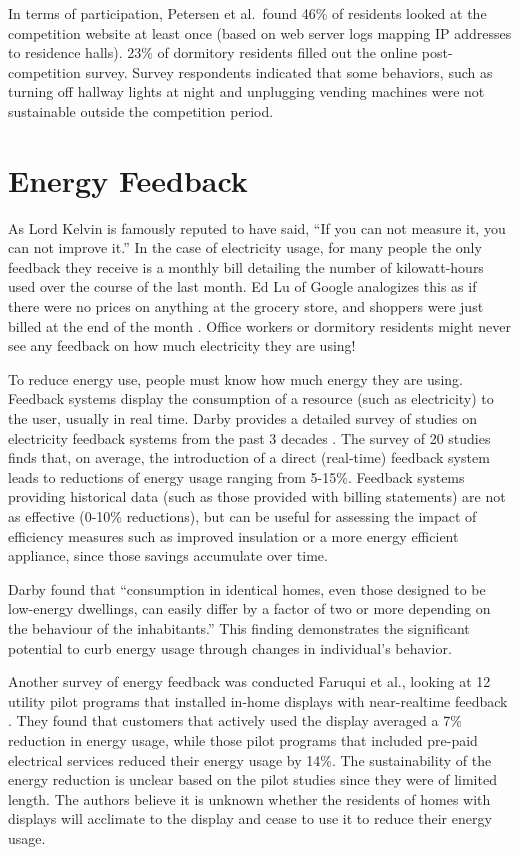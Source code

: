 In terms of participation, Petersen et al.\ found 46\% of residents looked at the competition website at least once (based on web server logs mapping IP addresses to residence halls). 23\% of dormitory residents filled out the online post-competition survey. Survey respondents indicated that some behaviors, such as turning off hallway lights at night and unplugging vending machines were not sustainable outside the competition period.


\section{Energy Feedback}
\label{sec:energy-feedback}

As Lord Kelvin is famously reputed to have said, ``If you can not measure it, you can not improve it.'' In the case of electricity usage, for many people the only feedback they receive is a monthly bill detailing the number of kilowatt-hours used over the course of the last month. Ed Lu of Google analogizes this as if there were no prices on anything at the grocery store, and shoppers were just billed at the end of the month \cite{Helft2008Googles-Energy}. Office workers or dormitory residents might never see any feedback on how much electricity they are using!

To reduce energy use, people must know how much energy they are using. Feedback systems display the consumption of a resource (such as electricity) to the user, usually in real time. Darby provides a detailed survey of studies on electricity feedback systems from the past 3 decades \cite{darby-review-2006}. The survey of 20 studies finds that, on average, the introduction of a direct (real-time) feedback system leads to reductions of energy usage ranging from 5-15\%. Feedback systems providing historical data (such as those provided with billing statements) are not as effective (0-10\% reductions), but can be useful for assessing the impact of efficiency measures such as improved insulation or a more energy efficient appliance, since those savings accumulate over time.

Darby found that ``consumption in identical homes, even those designed to be low-energy dwellings, can easily differ by a factor of two or more depending on the behaviour of the inhabitants.'' This finding demonstrates the significant potential to curb energy usage through changes in individual's behavior.

Another survey of energy feedback was conducted Faruqui et al., looking at 12 utility pilot programs that installed in-home displays with near-realtime feedback \cite{Faruqui09}. They found that customers that actively used the display averaged a 7\% reduction in energy usage, while those pilot programs that included pre-paid electrical services reduced their energy usage by 14\%. The sustainability of the energy reduction is unclear based on the pilot studies since they were of limited length. The authors believe it is unknown whether the residents of homes with displays will acclimate to the display and cease to use it to reduce their energy usage.

